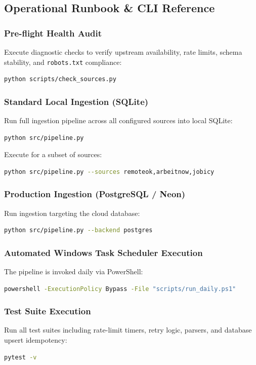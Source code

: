 \documentclass[10pt,letterpaper]{article}
\begin{document}
\subsection{Operational Runbook \& CLI Reference}

\subsubsection{Pre-flight Health Audit}
Execute diagnostic checks to verify upstream availability, rate limits, schema stability, and \texttt{robots.txt} compliance:
\begin{lstlisting}[language=bash]
python scripts/check_sources.py
\end{lstlisting}

\subsubsection{Standard Local Ingestion (SQLite)}
Run full ingestion pipeline across all configured sources into local SQLite:
\begin{lstlisting}[language=bash]
python src/pipeline.py
\end{lstlisting}

Execute for a subset of sources:
\begin{lstlisting}[language=bash]
python src/pipeline.py --sources remoteok,arbeitnow,jobicy
\end{lstlisting}

\subsubsection{Production Ingestion (PostgreSQL / Neon)}
Run ingestion targeting the cloud database:
\begin{lstlisting}[language=bash]
python src/pipeline.py --backend postgres
\end{lstlisting}

\subsubsection{Automated Windows Task Scheduler Execution}
The pipeline is invoked daily via PowerShell:
\begin{lstlisting}[language=bash]
powershell -ExecutionPolicy Bypass -File "scripts/run_daily.ps1"
\end{lstlisting}

\subsubsection{Test Suite Execution}
Run all test suites including rate-limit timers, retry logic, parsers, and database upsert idempotency:
\begin{lstlisting}[language=bash]
pytest -v
\end{lstlisting}
\end{document}
